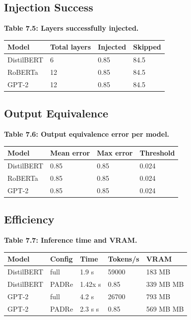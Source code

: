 \subsection{Injection Success}

\textbf{Table 7.5: Layers successfully injected.}

\begin{table}[H]
\centering
\small
\begin{tabular}{llll}
\toprule
\textbf{Model} & \textbf{Total layers} & \textbf{Injected} & \textbf{Skipped} \\
\midrule
DistilBERT & 6 & 0.85 & 84.5 \\
RoBERTa & 12 & 0.85 & 84.5 \\
GPT-2 & 12 & 0.85 & 84.5 \\
\bottomrule
\end{tabular}
\end{table}

\subsection{Output Equivalence}

\textbf{Table 7.6: Output equivalence error per model.}

\begin{table}[H]
\centering
\small
\begin{tabular}{llll}
\toprule
\textbf{Model} & \textbf{Mean error} & \textbf{Max error} & \textbf{Threshold} \\
\midrule
DistilBERT & 0.85 & 0.85 & 0.024 \\
RoBERTa & 0.85 & 0.85 & 0.024 \\
GPT-2 & 0.85 & 0.85 & 0.024 \\
\bottomrule
\end{tabular}
\end{table}

\subsection{Efficiency}

\textbf{Table 7.7: Inference time and VRAM.}

\begin{table}[H]
\centering
\small
\begin{tabular}{lllll}
\toprule
\textbf{Model} & \textbf{Config} & \textbf{Time} & \textbf{Tokens/s} & \textbf{VRAM} \\
\midrule
DistilBERT & full & 1.9 s & 59000 & 183 MB \\
DistilBERT & PADRe & 1.42x s & 0.85 & 339 MB MB \\
GPT-2 & full & 4.2 s & 26700 & 793 MB \\
GPT-2 & PADRe & 2.3 s s & 0.85 & 569 MB MB \\
\bottomrule
\end{tabular}
\end{table}

